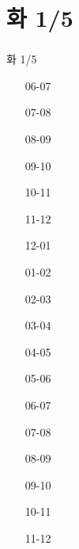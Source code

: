 \documentclass[aspectratio=1610,20pt,xcolor=pdftex,dvipsnames,table,handout]{beamer}
\begin{document}
	\section{화 1/5}											
	\begin{frame} [t,plain]											
	\frametitle{}											
		\begin{block} {화 1/5}										
		\setlength{\leftmargini}{3em}										
		\begin{itemize}										
			\item [06-07] \hrulefill									
			\item [07-08] \hrulefill									
			\item [08-09] \hrulefill									
			\item [09-10] \hrulefill									
			\item [10-11] \hrulefill									
			\item [11-12] \hrulefill									
			\item [12-01] \hrulefill									
			\item [01-02] \hrulefill									
			\item [02-03] \hrulefill									
			\item [03-04] \hrulefill	
			\item [04-05] \hrulefill									
			\item [05-06] \hrulefill									
			\item [06-07] \hrulefill									
			\item [07-08] \hrulefill									
			\item [08-09] \hrulefill									
			\item [09-10] \hrulefill									
			\item [10-11] \hrulefill									
			\item [11-12] \hrulefill									
		\end{itemize}										
		\end{block}										
	\end{frame}											
												
\end{document}

